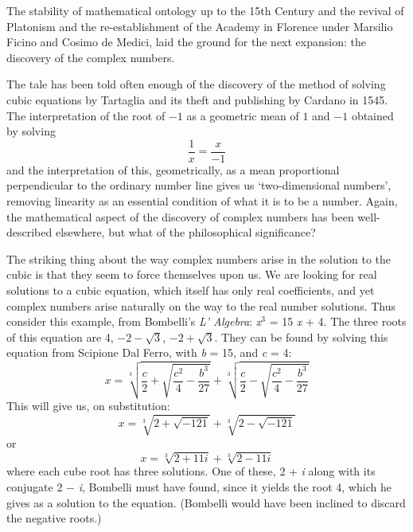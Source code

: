 \documentclass[11pt,oneside,a4paper]{article}
\newcommand*{\thing}[1]{\hspace{0.75pt}\textit{#1}\hspace{1.5pt}\xspace}
\begin{document}
The stability of mathematical ontology up to the 15th Century and the revival of Platonism and the re-establishment of the Academy in Florence under Marsilio Ficino and Cosimo de Medici, laid the ground for the next expansion: the discovery of the complex numbers.

The tale has been told often enough of the discovery of the method of solving cubic equations by Tartaglia and its theft and publishing by Cardano in 1545. The interpretation of the root of $-1$ as a geometric mean of $1$ and $-1$ obtained by solving$$\frac{1}{x} = \frac{x}{-1}$$ and the interpretation of this, geometrically, as a mean proportional perpen\-dicular to the ordinary number line gives us `two-dimensional numbers', removing linearity as an essential condition of what it is to be a number. Again, the mathematical aspect of the discovery of complex numbers has been well-described elsewhere, but what of the philosophical significance?

The striking thing about the way complex numbers arise in the solution to the cubic is that they seem to force themselves upon us. We are looking for real solutions to a cubic equation, which itself has only real coefficients, and yet complex numbers arise naturally on the way to the real number solutions. Thus consider this example, from Bombelli's \textit{L' Algebra}: \textit{x}$^{3}$ = 15\textit{ x} + 4.  The three roots of this equation are 4, $-2-\sqrt{3}$, $-2 + \sqrt{3}$. They can be found by solving this equation from Scipione Dal Ferro, with \thing{b} = 15, and \thing{c} = 4: $$x = \sqrt[3]{\frac{c}{2} + \sqrt{\frac{c^{2}}{4} - \frac{b^{3}}{27}}} + \sqrt[3]{\frac{c}{2} - \sqrt{\frac{c^{2}}{4} - \frac{b^{3}}{27}}}$$ This will give us, on substitution: $$x = \sqrt[3]{2 + \sqrt{-121}} + \sqrt[3]{2 - \sqrt{-121}}$$ or $$x = \sqrt[3]{2 + 11i} + \sqrt[3]{2 - 11i} $$ where each cube root has three solutions. One of these, 2 + \textit{i} along with its conjugate 2 $-$ \textit{i}, Bombelli must have found, since it yields the root 4, which he gives as a solution to the equation. (Bombelli would have been inclined to discard the negative roots.) 
\end{document}
